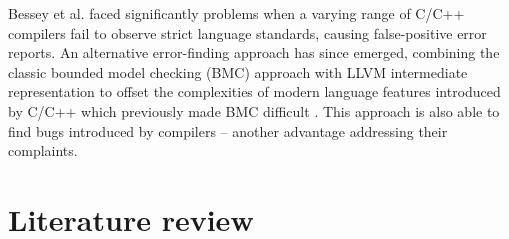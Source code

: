 \documentclass[11pt]{article}
\begin{document}
Bessey et al. \cite{bessey2010few} faced significantly problems when a varying range of C/C++ compilers fail to observe strict language standards, causing false-positive error reports. An alternative error-finding approach has since emerged, combining the classic bounded model checking (BMC) approach with LLVM intermediate representation to offset the complexities of modern language features introduced by C/C++ which previously made BMC difficult \cite{merz2012llbmc}. This approach is also able to find bugs introduced by compilers -- another advantage addressing their complaints.

\section{Literature review}



\footnotesize{}
\end{document}
